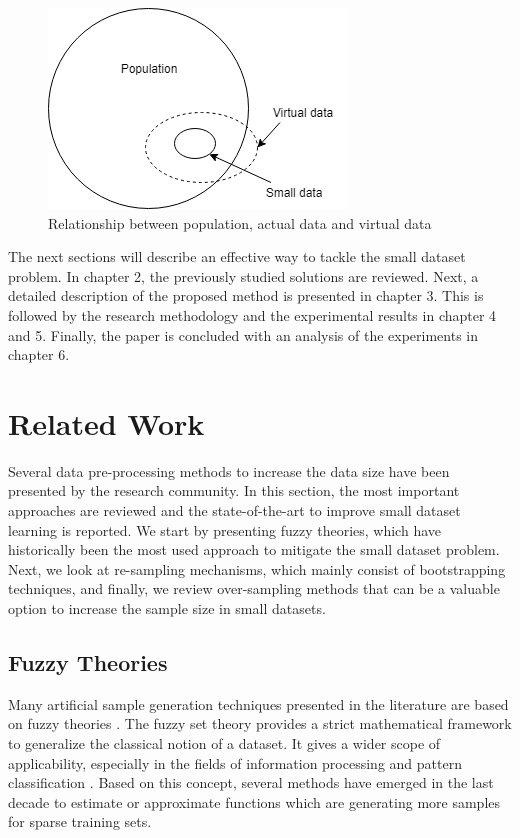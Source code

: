 \documentclass[parskip=full]{scrartcl}
\begin{document}
\begin{figure}[H]
	\centering
	\includegraphics[width=0.35\linewidth]{./resources/relationship}
	\caption{Relationship between population, actual data and virtual data \cite{Li.2006}}
	\label{fig:relationship}
\end{figure}

The next sections will describe an effective way to tackle the small dataset problem. In chapter 2, the 
previously studied solutions are reviewed. Next, a detailed description of the proposed method is 
presented in chapter 3. This is followed by the research methodology and the experimental results in 
chapter 4 and 5. Finally, the paper is concluded with an analysis of the experiments in chapter 6.

\section{Related Work}

Several data pre-processing methods to increase the data size have been presented by the research 
community. In this section, the most important approaches are reviewed and the state-of-the-art to 
improve small dataset learning is reported. We start by presenting fuzzy theories, which have 
historically been the most used approach to mitigate the small dataset problem.  Next, we look at 
re-sampling mechanisms, which mainly consist of bootstrapping techniques, and finally, we review 
over-sampling methods that can be a valuable option to increase the sample size in small datasets.

\subsection{Fuzzy Theories}

Many artificial sample generation techniques presented in the literature are based on fuzzy theories
\cite{AbdulLateh.2017}. The fuzzy set theory provides a strict mathematical framework to generalize the 
classical notion of a dataset. It gives a wider scope of applicability, especially in the fields of 
information processing and pattern classification \cite{Zimmermann.2010}. Based on this concept, 
several methods have emerged in the last decade to estimate or approximate functions which are 
generating more samples for sparse training sets.
\end{document}
